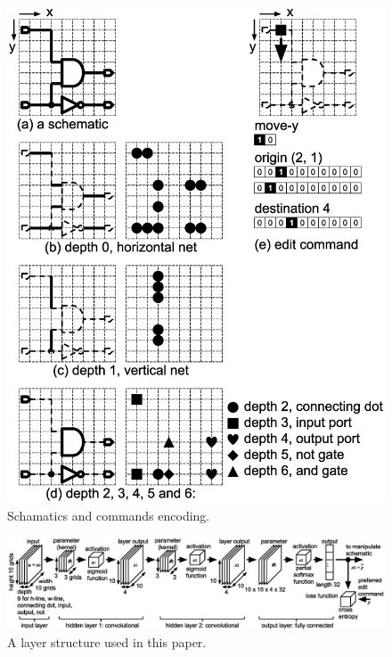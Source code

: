 \documentclass[twocolumn]{article}
\begin{document}
\begin{figure}[!tp]
 \begin{center}
  \begin{minipage}{\hsize}
   \includegraphics[width=\hsize]{fig/encode_02.eps}
   \caption{Schamatics and commands encoding.}
   \label{fig:encode}
  \end{minipage}
 \end{center}
\end{figure}

\begin{figure}[!tp]
 \begin{center}
  \begin{minipage}{\hsize}
   \includegraphics[width=\hsize]{fig/layers_06.eps}
   \caption{A layer structure used in this paper.}
   \label{fig:layers}
  \end{minipage}
 \end{center}
\end{figure}
\end{document}
